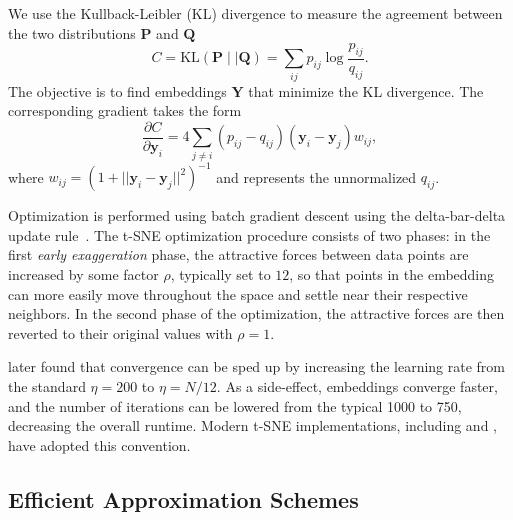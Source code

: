 \documentclass[article]{jss}
\newcommand{\opentsne}{\pkg{openTSNE}}
\begin{document}
We use the Kullback-Leibler (KL) divergence to measure the agreement
between the two distributions $\mathbf{P}$ and $\mathbf{Q}$
\begin{equation}
C = \text{KL}(\mathbf{P} \mid \mid \mathbf{Q}) = \sum_{ij} p_{ij} \log \frac{p_{ij}}{q_{ij}}.
\label{eq:kl_divergence}
\end{equation}
The objective is to find embeddings $\mathbf{Y}$ that minimize the KL divergence. The corresponding gradient takes the form
\begin{equation}
\frac{\partial C}{\partial \mathbf{y}_i} = 4 \sum_{j \neq i} \left ( p_{ij} - q_{ij} \right ) \left ( \mathbf{y}_i - \mathbf{y}_j \right ) w_{ij},
\label{eq:tsne_gradient}
\end{equation}
where $w_{ij} = \left ( 1 + || \mathbf{y}_i - \mathbf{y}_j || ^2 \right )^{-1}$
and represents the unnormalized $q_{ij}$.

Optimization is performed using batch gradient descent using the delta-bar-delta update rule~\citep{jacobs1988increased}. The t-SNE optimization procedure consists of two phases: in the first \textit{early exaggeration} phase, the attractive forces between data points are increased by some factor $\rho$, typically set to $12$, so that points in the embedding can more easily move throughout the space and settle near their respective neighbors. In the second phase of the optimization, the attractive forces are then reverted to their original values with $\rho=1$.

\citet{belkina2019automated} later found that convergence can be sped up by
increasing the learning rate from the standard $\eta=200$ to $\eta=N/12$. As a
side-effect, embeddings converge faster, and the number of iterations can be
lowered from the typical 1000 to 750, decreasing the overall runtime.  Modern
t-SNE implementations, including  and \opentsne, have adopted this
convention.

\subsection{Efficient Approximation Schemes} \label{sec:meth.approx}
\end{document}
